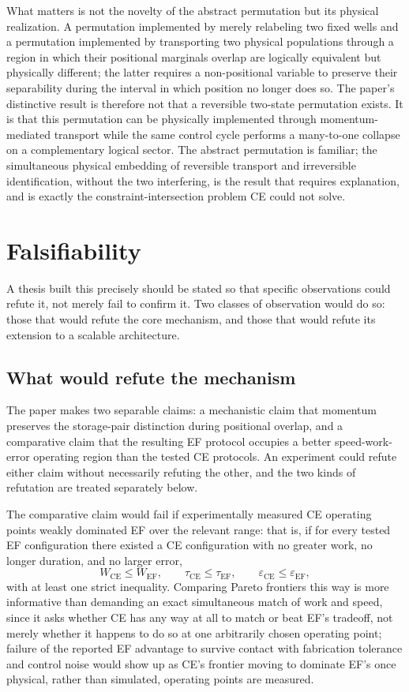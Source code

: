 \documentclass[11pt]{article}
\begin{document}
What matters is not the novelty of the abstract permutation but its physical realization. A permutation implemented by merely relabeling two fixed wells and a permutation implemented by transporting two physical populations through a region in which their positional marginals overlap are logically equivalent but physically different; the latter requires a non-positional variable to preserve their separability during the interval in which position no longer does so. The paper's distinctive result is therefore not that a reversible two-state permutation exists. It is that this permutation can be physically implemented through momentum-mediated transport while the same control cycle performs a many-to-one collapse on a complementary logical sector. The abstract permutation is familiar; the simultaneous physical embedding of reversible transport and irreversible identification, without the two interfering, is the result that requires explanation, and is exactly the constraint-intersection problem CE could not solve.

\section{Falsifiability}

A thesis built this precisely should be stated so that specific observations could refute it, not merely fail to confirm it. Two classes of observation would do so: those that would refute the core mechanism, and those that would refute its extension to a scalable architecture.

\subsection{What would refute the mechanism}

The paper makes two separable claims: a mechanistic claim that momentum preserves the storage-pair distinction during positional overlap, and a comparative claim that the resulting EF protocol occupies a better speed-work-error operating region than the tested CE protocols. An experiment could refute either claim without necessarily refuting the other, and the two kinds of refutation are treated separately below.

The comparative claim would fail if experimentally measured CE operating points weakly dominated EF over the relevant range: that is, if for every tested EF configuration there existed a CE configuration with no greater work, no longer duration, and no larger error,
\[
W_{\mathrm{CE}} \le W_{\mathrm{EF}}, \qquad \tau_{\mathrm{CE}} \le \tau_{\mathrm{EF}}, \qquad \varepsilon_{\mathrm{CE}} \le \varepsilon_{\mathrm{EF}},
\]
with at least one strict inequality. Comparing Pareto frontiers this way is more informative than demanding an exact simultaneous match of work and speed, since it asks whether CE has any way at all to match or beat EF's tradeoff, not merely whether it happens to do so at one arbitrarily chosen operating point; failure of the reported EF advantage to survive contact with fabrication tolerance and control noise would show up as CE's frontier moving to dominate EF's once physical, rather than simulated, operating points are measured.
\end{document}
